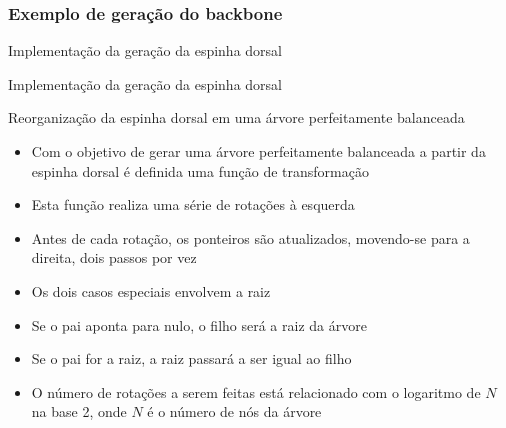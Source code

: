 \begin{frame}
\frametitle{Exemplo de geração do backbone}


\end{frame}

\begin{frame}[fragile]{Implementação da geração da espinha dorsal}
\end{frame}

\begin{frame}[fragile]{Implementação da geração da espinha dorsal}
\end{frame}

\begin{frame}[fragile]{Reorganização da espinha dorsal em uma árvore perfeitamente balanceada}

    \begin{itemize}
        \item Com o objetivo de gerar uma árvore perfeitamente balanceada a partir da espinha
            dorsal é definida uma função de transformação

        \item Esta função realiza uma série de rotações à esquerda

        \item Antes de cada rotação, os ponteiros  são atualizados, movendo-se
            para a direita, dois passos por vez

        \item Os dois casos especiais envolvem a raiz

        \item Se o pai aponta para nulo, o filho será a raiz da árvore

        \item Se o pai for a raiz, a raiz passará a ser igual ao filho

        \item O número de rotações a serem feitas está relacionado com o logaritmo de $N$ na 
            base 2, onde $N$ é o número de nós da árvore
    \end{itemize}

\end{frame}


